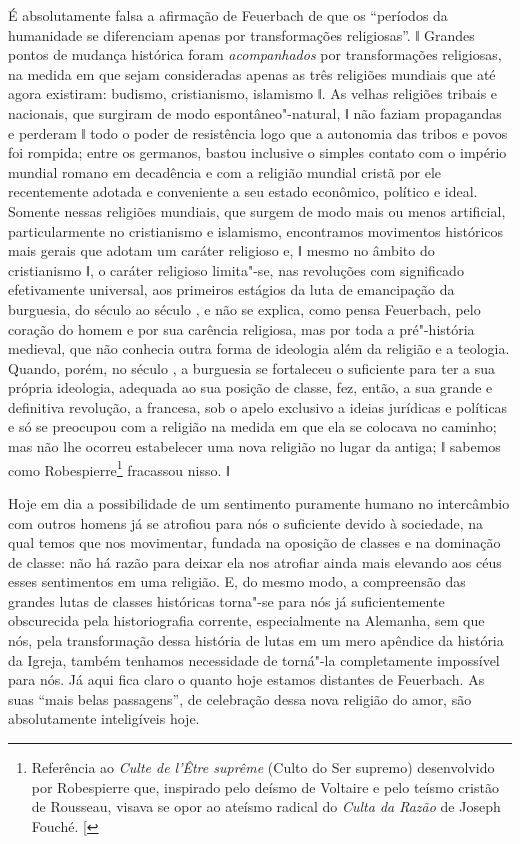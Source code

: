 É absolutamente falsa a afirmação
de Feuerbach
de que os ``períodos da humanidade se diferenciam apenas por
transformações religiosas''. ǁ Grandes pontos de mudança histórica
foram \emph{acompanhados }por transformações religiosas, na medida em
que sejam consideradas apenas as três religiões mundiais que até agora
existiram: budismo, cristianismo, islamismo ǁ. As velhas religiões
tribais e nacionais, que surgiram de modo espontâneo"-natural, ǁ não
faziam propagandas e perderam ǁ todo o poder de resistência logo que a
autonomia das tribos e povos foi rompida; entre os germanos, bastou
inclusive o simples contato com o império mundial romano em decadência e
com a religião mundial cristã por ele recentemente adotada e conveniente
a seu estado econômico, político e ideal. Somente nessas religiões
mundiais, que surgem de modo mais ou menos artificial, particularmente
no cristianismo e islamismo, encontramos movimentos históricos mais
gerais que adotam um caráter religioso e, ǁ mesmo no âmbito do
cristianismo ǁ, o caráter religioso limita"-se, nas revoluções com
significado efetivamente universal, aos primeiros estágios da luta de
emancipação da burguesia, do século  ao século , e não se
explica, como pensa
Feuerbach,
pelo coração do homem e por sua carência religiosa, mas por toda a
pré"-história medieval, que não conhecia outra forma de ideologia além da
religião e a teologia. Quando, porém, no século , a burguesia se
fortaleceu o suficiente para ter a sua própria ideologia, adequada ao
sua posição de classe, fez, então, a sua grande e definitiva revolução,
a francesa, sob o apelo exclusivo a ideias jurídicas e políticas e só se
preocupou com a religião na medida em que ela se colocava no caminho;
mas não lhe ocorreu estabelecer uma nova religião no lugar da antiga; ǁ
sabemos como Robespierre\footnote{Referência ao \emph{Culte de l'Être suprême} (Culto do Ser supremo) desenvolvido por Robespierre que, inspirado pelo deísmo de Voltaire e
  pelo teísmo cristão de Rousseau, visava se opor ao ateísmo radical do
  \emph{Culta da Razão} de Joseph Fouché. {[}\versal{N.\,T.}{]}} fracassou nisso. ǁ

Hoje em dia a possibilidade de um sentimento puramente humano no
intercâmbio com outros homens já se atrofiou para nós o suficiente
devido à sociedade, na qual temos que nos movimentar, fundada na
oposição de classes e na dominação de classe: não há razão para deixar
ela nos atrofiar ainda mais elevando aos céus esses sentimentos em uma
religião. E, do mesmo modo, a compreensão das grandes lutas de classes
históricas torna"-se para nós já suficientemente obscurecida pela
historiografia corrente, especialmente na Alemanha, sem que nós, pela
transformação dessa história de lutas em um mero apêndice da história da
Igreja, também tenhamos necessidade de torná"-la completamente impossível
para nós. Já aqui fica claro o quanto hoje estamos distantes
de Feuerbach.
As suas ``mais belas passagens'', de celebração dessa nova religião do
amor, são absolutamente inteligíveis hoje.

